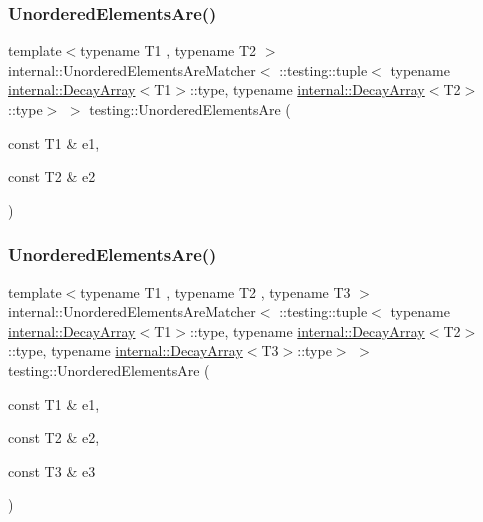 \mbox{\label{namespacetesting_aedcecfa2107e03f5e2837f7124f73a87}} 
\subsubsection{\texorpdfstring{UnorderedElementsAre()}{UnorderedElementsAre()}\hspace{0.1cm}{\footnotesize\ttfamily [3/11]}}
{\footnotesize\ttfamily template$<$typename T1 , typename T2 $>$ \\
internal\+::\+Unordered\+Elements\+Are\+Matcher$<$ \+::testing\+::tuple$<$ typename \mbox{\hyperlink{structtesting_1_1internal_1_1_decay_array}{internal\+::\+Decay\+Array}}$<$T1$>$\+::type, typename \mbox{\hyperlink{structtesting_1_1internal_1_1_decay_array}{internal\+::\+Decay\+Array}}$<$T2$>$\+::type$>$ $>$ testing\+::\+Unordered\+Elements\+Are (\begin{DoxyParamCaption}\item[{const T1 \&}]{e1,  }\item[{const T2 \&}]{e2 }\end{DoxyParamCaption})\hspace{0.3cm}{\ttfamily [inline]}}

\mbox{\label{namespacetesting_aec0f9ede2dc05de791c61eae0504a757}} 
\subsubsection{\texorpdfstring{UnorderedElementsAre()}{UnorderedElementsAre()}\hspace{0.1cm}{\footnotesize\ttfamily [4/11]}}
{\footnotesize\ttfamily template$<$typename T1 , typename T2 , typename T3 $>$ \\
internal\+::\+Unordered\+Elements\+Are\+Matcher$<$ \+::testing\+::tuple$<$ typename \mbox{\hyperlink{structtesting_1_1internal_1_1_decay_array}{internal\+::\+Decay\+Array}}$<$T1$>$\+::type, typename \mbox{\hyperlink{structtesting_1_1internal_1_1_decay_array}{internal\+::\+Decay\+Array}}$<$T2$>$\+::type, typename \mbox{\hyperlink{structtesting_1_1internal_1_1_decay_array}{internal\+::\+Decay\+Array}}$<$T3$>$\+::type$>$ $>$ testing\+::\+Unordered\+Elements\+Are (\begin{DoxyParamCaption}\item[{const T1 \&}]{e1,  }\item[{const T2 \&}]{e2,  }\item[{const T3 \&}]{e3 }\end{DoxyParamCaption})\hspace{0.3cm}{\ttfamily [inline]}}

